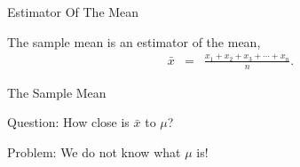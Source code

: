 \begin{frame}{Estimator Of The Mean}

  \begin{definition}
    The sample mean is an estimator of the mean,
  \begin{eqnarray*}
    \bar{x} & = & \frac{x_1 + x_2 + x_3 + \cdots + x_{n}}{n}.
  \end{eqnarray*}    
  \end{definition}
  
  \vfill
  \vfill
  \vfill

\end{frame}


\begin{frame}{The Sample Mean}


Question: How close is $\bar{x}$ to $\mu$? 

Problem: We do not know what $\mu$ is!
  
\end{frame}


